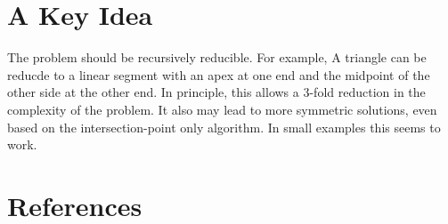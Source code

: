 \documentclass[11pt]{article}
\begin{document}
\section{A Key Idea}

The problem should be recursively reducible. For example, A triangle can
be reducde to a linear segment with an apex at one end and the midpoint of the
other side at the other end.  In principle, this allows a 3-fold reduction
in the complexity of the problem.  It also may lead to more symmetric solutions,
even based on the intersection-point only algorithm.  In small examples this seems
to work.



\section{References}
\end{document}
